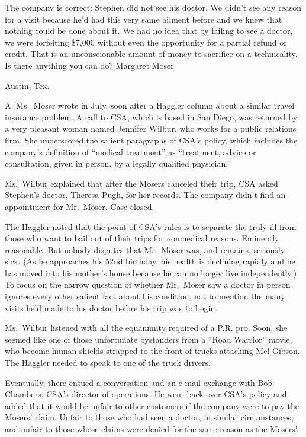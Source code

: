 ﻿\documentclass[12pt]{article}
\begin{document}
The company is correct: Stephen did not see his doctor. We didn't see any reason for a visit because
he'd had this very same ailment before and we knew that nothing could be done about it. We had no
idea that by failing to see a doctor, we were forfeiting \$7,000 without even the opportunity for a
partial refund or credit. That is an unconscionable amount of money to sacrifice on a technicality.
Is there anything you can do? Margaret Moser

Austin, Tex.

A. Ms.~Moser wrote in July, soon after a Haggler column about a similar travel insurance problem. A
call to CSA, which is based in San Diego, was returned by a very pleasant woman named Jennifer
Wilbur, who works for a public relations firm. She underscored the salient paragraphs of CSA's
policy, which includes the company's definition of ``medical treatment'' as ``treatment, advice or
consultation, given in person, by a legally qualified physician.''

Ms.~Wilbur explained that after the Mosers canceled their trip, CSA asked Stephen's doctor, Theresa
Pugh, for her records. The company didn't find an appointment for Mr.~Moser. Case closed.

The Haggler noted that the point of CSA's rules is to separate the truly ill from those who want to
bail out of their trips for nonmedical reasons. Eminently reasonable. But nobody disputes that
Mr.~Moser was, and remains, seriously sick. (As he approaches his 52nd birthday, his health is
declining rapidly and he has moved into his mother's house because he can no longer live
independently.) To focus on the narrow question of whether Mr.~Moser saw a doctor in person ignores
every other salient fact about his condition, not to mention the many visits he'd made to his doctor
before his trip was to begin.

Ms.~Wilbur listened with all the equanimity required of a P.R. pro. Soon, she seemed like one of
those unfortunate bystanders from a ``Road Warrior'' movie, who become human shields strapped to the
front of trucks attacking Mel Gibson. The Haggler needed to speak to one of the truck drivers.

Eventually, there ensued a conversation and an e-mail exchange with Bob Chambers, CSA's director of
operations. He went back over CSA's policy and added that it would be unfair to other customers if
the company were to pay the Mosers' claim. Unfair to those who had seen a doctor, in similar
circumstances, and unfair to those whose claims were denied for the same reason as the Mosers'.
\end{document}
